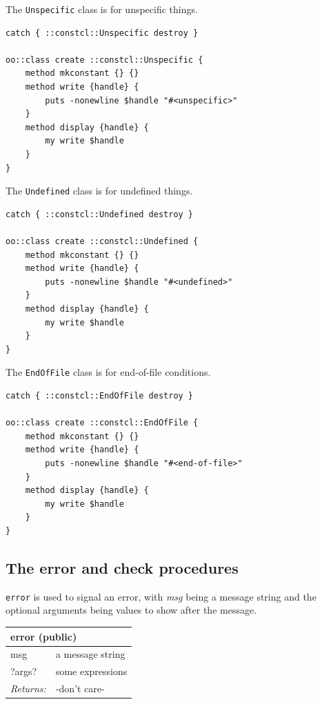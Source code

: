 \documentclass[twoside,9pt]{report}
\begin{document}
The \texttt{Unspecific} class is for unspecific things.

\noindent\makebox[\linewidth]{\rule{\linewidth}{0.4pt}}
\begin{lstlisting}
catch { ::constcl::Unspecific destroy }
 
oo::class create ::constcl::Unspecific {
    method mkconstant {} {}
    method write {handle} {
        puts -nonewline $handle "#<unspecific>"
    }
    method display {handle} {
        my write $handle
    }
}
\end{lstlisting}
\noindent\makebox[\linewidth]{\rule{\linewidth}{0.4pt}}

The \texttt{Undefined} class is for undefined things.

\noindent\makebox[\linewidth]{\rule{\linewidth}{0.4pt}}
\begin{lstlisting}
catch { ::constcl::Undefined destroy }
 
oo::class create ::constcl::Undefined {
    method mkconstant {} {}
    method write {handle} {
        puts -nonewline $handle "#<undefined>"
    }
    method display {handle} {
        my write $handle
    }
}
\end{lstlisting}
\noindent\makebox[\linewidth]{\rule{\linewidth}{0.4pt}}

The \texttt{EndOfFile} class is for end-of-file conditions.

\noindent\makebox[\linewidth]{\rule{\linewidth}{0.4pt}}
\begin{lstlisting}
catch { ::constcl::EndOfFile destroy }
 
oo::class create ::constcl::EndOfFile {
    method mkconstant {} {}
    method write {handle} {
        puts -nonewline $handle "#<end-of-file>"
    }
    method display {handle} {
        my write $handle
    }
}
\end{lstlisting}
\noindent\makebox[\linewidth]{\rule{\linewidth}{0.4pt}}
\subsection{The error and check procedures}
\label{the-error-and-check-procedures}

\texttt{error} is used to signal an error, with \emph{msg} being a message string and the optional arguments being values to show after the message.

\begin{tabular}{ |l l| }
\hline
\multicolumn{2}{|l|}{error (public)} \\
\hline
msg & a message string \\
?args? & some expressions \\
\textit{Returns:} & -don't care- \\
\hline
\end{tabular}
\end{document}
